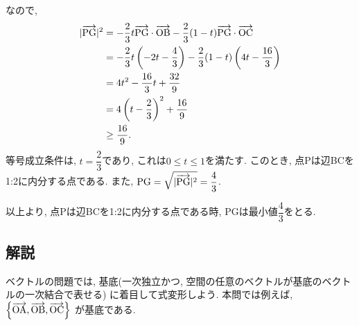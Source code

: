 \documentclass[dvipdfmx,a4paper]{jsarticle}
\begin{document}
\begin{itemize}
        なので, 
        \begin{align*}
            |\overrightarrow{\mathrm{PG}}|^2 
            &= - \dfrac{2}{3}t \overrightarrow{\mathrm{PG}} \cdot \overrightarrow{\mathrm{OB}} - \dfrac{2}{3} (1-t) \overrightarrow{\mathrm{PG}} \cdot \overrightarrow{\mathrm{OC}} \\
            &= - \dfrac{2}{3}t \left(-2t - \dfrac{4}{3}\right) - \dfrac{2}{3} (1-t) \left(4t - \dfrac{16}{3}\right) \\
            &= 4t^2 - \dfrac{16}{3}t + \dfrac{32}{9} \\
            &= 4 \left(t- \dfrac{2}{3}\right)^2 + \dfrac{16}{9} \\
            &\geq \dfrac{16}{9}. 
        \end{align*}
        等号成立条件は, $t=\dfrac{2}{3}$であり, これは$0\leq t\leq 1$を満たす. 
        このとき, 点Pは辺BCを1:2に内分する点である. また, $\mathrm{PG} = \sqrt{|\overrightarrow{\mathrm{PG}}|^2 } = \dfrac{4}{3}$. 

        以上より, 点Pは辺BCを1:2に内分する点である時, PGは最小値$\dfrac{4}{3}$をとる. 

    \end{itemize}
    


    

    \subsection{解説}
    ベクトルの問題では, 基底(一次独立かつ, 空間の任意のベクトルが基底のベクトルの一次結合で表せる)
    に着目して式変形しよう. 本問では例えば, $\left\{\overrightarrow{\mathrm{OA}}, \overrightarrow{\mathrm{OB}}, \overrightarrow{\mathrm{OC}}\right\}$
    が基底である. 
    
\end{document}
